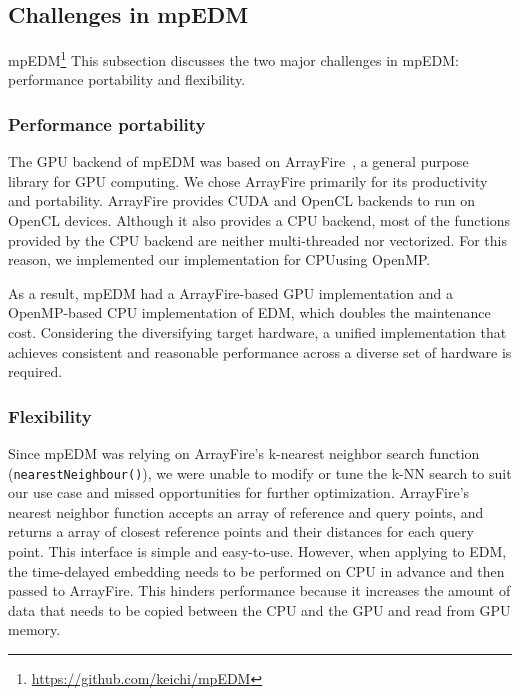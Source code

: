 \documentclass[conference]{IEEEtran}
\begin{document}
\subsection{Challenges in mpEDM}\label{sec:challenges}

mpEDM\footnote{\url{https://github.com/keichi/mpEDM}}
This subsection discusses the two major challenges in mpEDM: performance
portability and flexibility.

\subsubsection{Performance portability}\label{sec:portability}

The GPU backend of mpEDM was based on ArrayFire~\cite{Malcolm2012}, a general
purpose library for GPU computing. We chose ArrayFire primarily for its
productivity and portability. ArrayFire provides CUDA and OpenCL backends to
run on OpenCL devices. Although it also provides a CPU backend, most of the
functions provided by the CPU backend are neither multi-threaded nor
vectorized. For this reason, we implemented our implementation for CPU\@ using
OpenMP\@.

As a result, mpEDM had a ArrayFire-based GPU implementation and a OpenMP-based
CPU implementation of EDM, which doubles the maintenance cost. Considering the
diversifying target hardware, a unified implementation that achieves
consistent and reasonable performance across a diverse set of hardware is
required.

\subsubsection{Flexibility}\label{sec:flexibility}

Since mpEDM was relying on ArrayFire's k-nearest neighbor search function
(\texttt{nearestNeighbour()}), we were unable to modify or tune the k-NN
search to suit our use case and missed opportunities for further optimization.
ArrayFire's nearest neighbor function accepts an array of reference and query
points, and returns a array of closest reference points and their distances
for each query point. This interface is simple and easy-to-use. However, when
applying to EDM, the time-delayed embedding needs to be performed on CPU in
advance and then passed to ArrayFire. This hinders performance because it
increases the amount of data that needs to be copied between the CPU and the
GPU and read from GPU memory.
\end{document}
